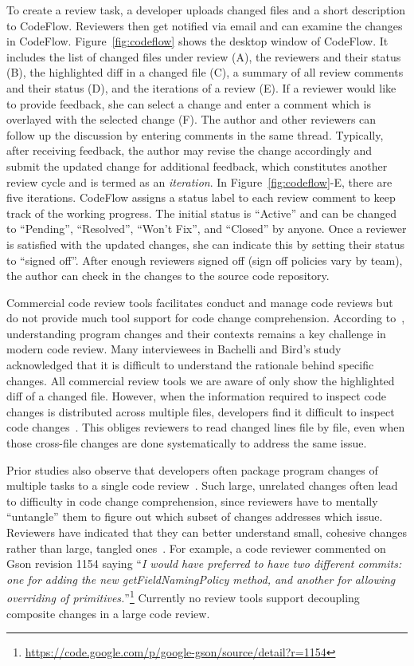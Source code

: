 \documentclass[runningheads,a4paper]{llncs}
\begin{document}
To create a review task, a developer uploads changed files and a short description to CodeFlow. Reviewers then get notified via email and can examine the changes in CodeFlow. Figure~\ref{fig:codeflow} shows the desktop window of CodeFlow. It includes the list of changed files under review (A), the reviewers and their status (B), the highlighted diff in a changed file (C), a summary of all review comments and their status (D), and the iterations of a review (E). If a reviewer would like to provide feedback, she can select a change and enter a comment which is overlayed with the selected change (F). The author and other reviewers can follow up the discussion by entering comments in the same thread. Typically, after receiving feedback, the author may revise the change accordingly and submit the updated change for additional feedback, which constitutes another review cycle and is termed as an {\em iteration}. In Figure~\ref{fig:codeflow}-E, there are five iterations. CodeFlow assigns a status label to each review comment to keep track of the working progress. The initial status is ``Active'' and can be changed to ``Pending'', ``Resolved'', ``Won't Fix'', and ``Closed'' by anyone. Once a reviewer is satisfied with the updated changes, she can indicate this by setting their status to ``signed off''. After enough reviewers signed off (sign off policies vary by team), the author can check in the changes to the source code repository.

Commercial code review tools facilitates conduct and manage code reviews but do not provide much tool support for code change comprehension. According to~\cite{bacchelli2013expectations}, understanding program changes and their contexts remains a key challenge in modern code review. Many interviewees in Bachelli and Bird's study acknowledged that it is difficult to understand the rationale behind specific changes. All commercial review tools we are aware of only show the highlighted diff of a changed file. However, when the information required to inspect code changes is distributed across multiple files, developers find it difficult to inspect code changes~\cite{Dunsmore2000:ooinspection}. This obliges reviewers to read changed lines file by file, even when those cross-file changes are done systematically to address the same issue. 

Prior studies also observe that developers often package program changes of multiple tasks to a single code review~\cite{Kawrykow2011,Murphy-Hill2012:refactor,herzig2013impact}. Such large, unrelated changes often lead to difficulty in code change comprehension, since reviewers have to mentally ``untangle'' them to figure out which subset of changes addresses which issue. Reviewers have indicated that they can better understand small, cohesive changes rather than large, tangled ones~\cite{Rigby2008:apache}. For example, a code reviewer commented on Gson revision 1154 saying ``{\em I would have preferred to have two different commits: one for adding the new {\ttt getFieldNamingPolicy} method, and another for allowing overriding of primitives.}''\footnote{\url{https://code.google.com/p/google-gson/source/detail?r=1154}} Currently no review tools support decoupling composite changes in a large code review. 
\end{document}
